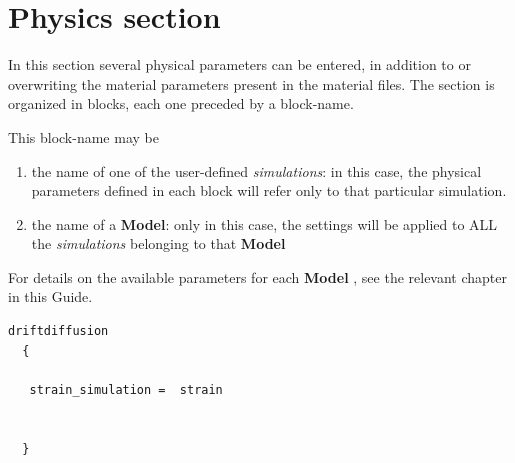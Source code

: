 % 
% 
% 
% 
% 
% 
% 
% 
% 
% 
% 
% 
% 
% 
% 
% 
% 
% 
% 




\section{Physics section }

\label{section:physics}

In this section several physical parameters can be entered,  in  addition to or  overwriting  the material parameters present in the material files.
The section is organized in blocks, each one preceded by a block-name.

This block-name may be 
\begin{enumerate}
 \item the  name  of one of the  user-defined \textit{simulations}: in this case, the physical  parameters defined in each block will refer only to that particular simulation.
\item the  name  of   a \TiberCAD   \textbf{Model}: only in  this  case, the settings  will  be  applied  to  ALL the \textit{simulations} belonging to  that \textbf{Model}
\end{enumerate}
For details on the available  parameters for each \textbf{Model} ,  see  the relevant  chapter in  this  Guide.



\begin{inputfile}
\begin{verbatim}
driftdiffusion
  {
    
   strain_simulation =  strain


  }
\end{verbatim}
\end{inputfile}

